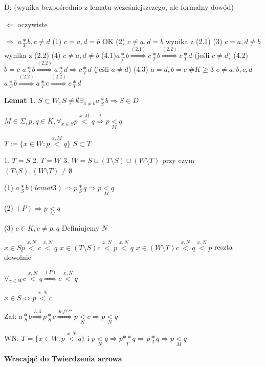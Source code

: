 \documentclass[12pt,a4paper]{article}
\theoremstyle{break}
\newtheorem{lemma}{Lemat}[section]
\begin{document}
	D: (wynika bezpośrednio z lematu wcześniejszczego, ale formalny dowód)
	
	$\Leftarrow$ oczywiste
	
	$\Rightarrow$ $a\underset{T}{*}b, c\neq d$
	(1) $c=a, d=b$ OK
	(2) $c\neq a, d=b$ wynika z (2.1)	
	(3) $c=a, d\neq b$ wynika z (2.2)
	(4) $c\neq a, d\neq b$ 
	(4.1)$a\underset{T}{*}b \overset{(2.1)}{\Rightarrow} c\underset{T}{*}b \overset{(2.2)}{\Rightarrow} c\underset{T}{*}d$ (jeśli $c\neq d$)
	(4.2) $b=c$
	$a\underset{T}{*}b \overset{(2.2)}{\Rightarrow} a\underset{T}{*}d \Rightarrow c \underset{T}{*}d$ (jeśli $a\neq d$)
	(4.3) $a=d, b=c \; \#K\geq 3$
	$e\neq a,b,c,d$
	$a\underset{T}{*}b\overset{(2.2)}{\Rightarrow}a\underset{T}{*}e \overset{(2.2)}{\Rightarrow} c\underset{T}{*}d$ 
	
	\begin{lemma}
		$S\subset W, S\neq \emptyset \exists_{a\neq b} a\underset{S}{*}b \Rightarrow S\in D$
	\end{lemma}
	
	$M\in \Sigma, p,q \in K, \forall_{x\in S} p\overset{x,M}{<}q \overset{?}{\Rightarrow} p\underset{M}{<}q$
	
	$T:=\{ x\in W: p\overset{x,M}{<}q\}$ $S\subset T$
	
	1. $T=S$
	2. $T=W$
	3. $W=S \cup (T\setminus S) \cup (W\setminus T)$ przy czym $(T\setminus S),(W\setminus T)\neq \emptyset$
	
	(1) $a\underset{S}{*}b (lemat 3) \Rightarrow p\underset{S}{*}q \Rightarrow p\underset{M}{<}q$
	
	(2) $(P)\Rightarrow p\underset{M}{<}q$
	
	(3) $c\in K, c\neq p,q$ Definiujemy $N$
	
	$x\in S p\overset{x,N}{<}c\overset{x,N}{<}q$
	$x\in (T\setminus S) c \overset{x,N}{<}p \overset{x,N}{<}q$
	$x\in (W\setminus T) c \overset{x,N}{<}q \overset{x,N}{<}p$ reszta dowolnie
	
	$\forall_{x\in W} c\overset{x,N}{<}q \overset{(P)}{\Rightarrow} c\overset{x,N}{<}q$
	
	$x\in S \Leftrightarrow p\overset{x,N}{<}c$
	
	Zał: $a\underset{S}{*}b \overset{L. 3}{\Rightarrow} p\underset{S}{*}c \overset{def ???}{\Rightarrow} p \underset{N}{<}c \Rightarrow p\underset{N}{<}q$
	
	WN: $T=\{ x\in W: p\overset{x,N}{<}q\}$ i $p\underset{N}{<}q \Rightarrow p\underset{T}{**}q \Rightarrow p\underset{T}{*}q\Rightarrow p\underset{M}{<}q$
	
	
	\textbf{Wracająć do Twierdzenia arrowa}
	
\end{document}

